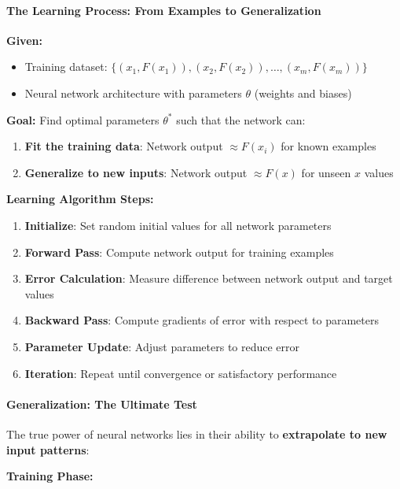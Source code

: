 \paragraph{The Learning Process: From Examples to Generalization}

\textbf{Given:}

\begin{itemize}
\item Training dataset: $\{(x_1, F(x_1)), (x_2, F(x_2)), \ldots, (x_m, F(x_m))\}$
\item Neural network architecture with parameters $\theta$ (weights and biases)
\end{itemize}

\textbf{Goal:}
Find optimal parameters $\theta^*$ such that the network can:

\begin{enumerate}
\item \textbf{Fit the training data}: Network output $\approx F(x_i)$ for known examples
\item \textbf{Generalize to new inputs}: Network output $\approx F(x)$ for unseen $x$ values
\end{enumerate}

\textbf{Learning Algorithm Steps:}

\begin{enumerate}
\item \textbf{Initialize}: Set random initial values for all network parameters
\item \textbf{Forward Pass}: Compute network output for training examples
\item \textbf{Error Calculation}: Measure difference between network output and target values
\item \textbf{Backward Pass}: Compute gradients of error with respect to parameters
\item \textbf{Parameter Update}: Adjust parameters to reduce error
\item \textbf{Iteration}: Repeat until convergence or satisfactory performance
\end{enumerate}

\paragraph{Generalization: The Ultimate Test}

The true power of neural networks lies in their ability to \textbf{extrapolate to new input patterns}:

\textbf{Training Phase:}

